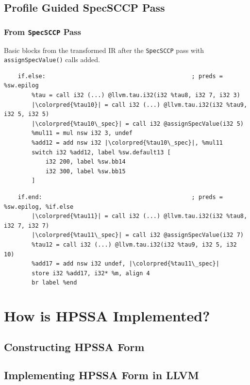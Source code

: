 \documentclass[aspectratio=169, compress]{beamer}
\newcommand{\colorpred}[1]{\colorbox{green}{#1}}
\begin{document}
\subsection{Profile Guided SpecSCCP Pass}
{
	
}
\begin{frame}[fragile]
	\frametitle{From \texttt{SpecSCCP} Pass}
	Basic blocks from the transformed IR after the \texttt{SpecSCCP} pass with \texttt{assignSpecValue()} calls added.
	\begin{verbatim}
	if.else:                                          ; preds = %sw.epilog
		%tau = call i32 (...) @llvm.tau.i32(i32 %tau8, i32 7, i32 3)
		|\colorpred{%tau10}| = call i32 (...) @llvm.tau.i32(i32 %tau9, i32 5, i32 5)	
		|\colorpred{%tau10\_spec}| = call i32 @assignSpecValue(i32 5)
		%mul11 = mul nsw i32 3, undef
		%add12 = add nsw i32 |\colorpred{%tau10\_spec}|, %mul11
		switch i32 %add12, label %sw.default13 [
			i32 200, label %sw.bb14
			i32 300, label %sw.bb15
		]
	\end{verbatim}
	\begin{verbatim}
	if.end:                                           ; preds = %sw.epilog, %if.else
		|\colorpred{%tau11}| = call i32 (...) @llvm.tau.i32(i32 %tau8, i32 7, i32 7)
		|\colorpred{%tau11\_spec}| = call i32 @assignSpecValue(i32 7)
		%tau12 = call i32 (...) @llvm.tau.i32(i32 %tau9, i32 5, i32 10)
		%add17 = add nsw i32 undef, |\colorpred{%tau11\_spec}|
		store i32 %add17, i32* %m, align 4
		br label %end
	\end{verbatim}
\end{frame}
\footnotesize

\section{How is HPSSA Implemented?}
\subsection{Constructing HPSSA Form}
{
	
}
{
	
}
\subsection{Implementing HPSSA Form in LLVM}
\end{document}
